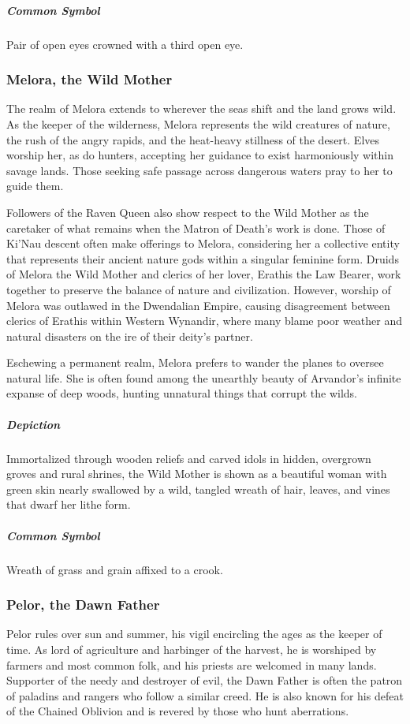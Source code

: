 \documentclass[letterpaper, twocolumn, openany, nodeprecatedcode, layout=true]{dndbook}
\begin{document}
\subparagraph{Common Symbol}
Pair of open eyes crowned with a third open eye.

\subsubsection{Melora, the Wild Mother}

The realm of Melora extends to wherever the seas shift and the land grows wild. As the
keeper of the wilderness, Melora represents the wild creatures of nature, the rush of the
angry rapids, and the heat-heavy stillness of the desert. Elves worship her, as do hunters,
accepting her guidance to exist harmoniously within savage lands. Those seeking safe passage
across dangerous waters pray to her to guide them.

Followers of the Raven Queen also show respect to the Wild Mother as the caretaker of
what remains when the Matron of Death’s work is done. Those of Ki’Nau descent often make
offerings to Melora, considering her a collective entity that represents their ancient nature
gods within a singular feminine form. Druids of Melora the Wild Mother and clerics of her
lover, Erathis the Law Bearer, work together to preserve the balance of nature and
civilization. However, worship of Melora was outlawed in the Dwendalian Empire, causing
disagreement between clerics of Erathis within Western Wynandir, where many blame poor
weather and natural disasters on the ire of their deity’s partner.

Eschewing a permanent realm, Melora prefers to wander the planes to oversee natural life.
She is often found among the unearthly beauty of Arvandor’s infinite expanse of deep woods,
hunting unnatural things that corrupt the wilds.

\subparagraph{Depiction}
Immortalized through wooden reliefs and carved idols in hidden, overgrown groves and rural
shrines, the Wild Mother is shown as a beautiful woman with green skin nearly swallowed by
a wild, tangled wreath of hair, leaves, and vines that dwarf her lithe form.

\subparagraph{Common Symbol}
Wreath of grass and grain affixed to a crook.

\subsubsection{Pelor, the Dawn Father}

Pelor rules over sun and summer, his vigil encircling the ages as the keeper of time. As
lord of agriculture and harbinger of the harvest, he is worshiped by farmers and most common
folk, and his priests are welcomed in many lands. Supporter of the needy and destroyer of
evil, the Dawn Father is often the patron of paladins and rangers who follow a similar creed.
He is also known for his defeat of the Chained Oblivion and is revered by those who
hunt aberrations.
\end{document}
